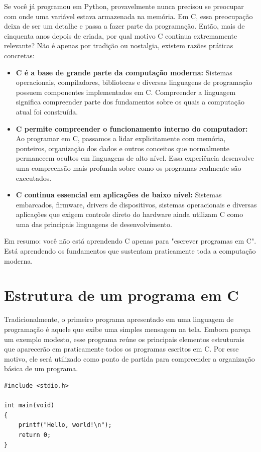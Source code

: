 Se você já programou em Python, provavelmente nunca precisou se preocupar com onde uma variável estava armazenada na memória. Em C, essa preocupação deixa de ser um detalhe e passa a fazer parte da programação. Então, mais de cinquenta anos depois de criada, por qual motivo C continua extremamente relevante? 
Não é apenas por tradição ou nostalgia, existem razões práticas concretas:


\begin{itemize}
    \item[--] \textbf{C é a base de grande parte da computação moderna:} Sistemas operacionais, compiladores, bibliotecas e diversas linguagens de programação possuem componentes implementados em C. Compreender a linguagem significa compreender parte dos fundamentos sobre os quais a computação atual foi construída.
    \item[--] \textbf{C permite compreender o funcionamento interno do computador:} Ao programar em C, passamos a lidar explicitamente com memória, ponteiros, organização dos dados e outros conceitos que normalmente permanecem ocultos em linguagens de alto nível. Essa experiência desenvolve uma compreensão mais profunda sobre como os programas realmente são executados.
    \item[--] \textbf{C continua essencial em aplicações de baixo nível:} Sistemas embarcados, firmware, drivers de dispositivos, sistemas operacionais e diversas aplicações que exigem controle direto do hardware ainda utilizam C como uma das principais linguagens de desenvolvimento.
\end{itemize}

Em resumo: você não está aprendendo C apenas para "escrever programas em C". Está aprendendo os fundamentos que sustentam praticamente toda a computação moderna.


\section{Estrutura de um programa em C}
\label{sec:estrutura-programa}

Tradicionalmente, o primeiro programa apresentado em uma linguagem de programação é aquele que exibe uma simples mensagem na tela. Embora pareça um exemplo modesto, esse programa reúne os principais elementos estruturais que aparecerão em praticamente todos os programas escritos em C. Por esse motivo, ele será utilizado como ponto de partida para compreender a organização básica de um programa.

\begin{lstlisting}
#include <stdio.h>

int main(void)
{
    printf("Hello, world!\n");
    return 0;
}
\end{lstlisting}

